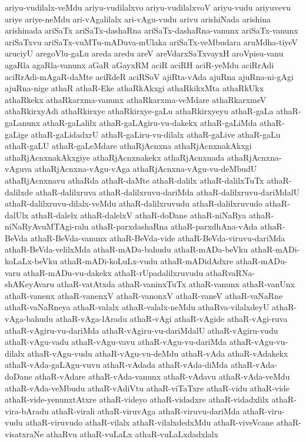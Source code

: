 {ariyu-vudilalx-veMdu
ariyu-vudilalxvo
ariyu-vudilalxvoV
ariyu-vudu
ariyuvevu
ariye
ariye-neMdu
ari-vAgalilalx
ari-vAgu-vudu
arivu
arishiNada
arishina
arishinada
ariSaTx
ariSaTx-dashaRna
ariSaTx-dashaRna-vanunx
ariSaTx-vanunx
ariSaTxvu
ariSaTx-vuMTu-mADuva-mUlaka
ariSaTx-veMbudara
aruMdha-tiyeV
aruciyU
aregoVlu-gaLu
areda
aredu
areV
areVdarxSaTxvayxH
aroVpisu-vanu
agaRla
agaRla-vanunx
aGaR
aGayxRM
aciR
aciRH
aciR-yeMdu
aciRrAdi
aciRrAdi-mAgaR-daMte
aciRdeR
aciRSoV
ajiRta-vAda
ajuRna
ajuRna-ni-gAgi
ajuRna-nige
athaR
athaR-Eke
athaRkAkxgi
athaRkikxMta
athaRkUkx
athaRkekx
athaRkarxma-vanunx
athaRkarxma-veMdare
athaRkarxmeV
athaRkirxyAdi
athaRkirxye
athaRkirxye-gaLu
athaRkirxyeyu
athaR-gaLa
athaR-gaLanunx
athaR-gaLalilx
athaR-gaLAgiru-vu-dakekx
athaR-gaLiMda
athaR-gaLige
athaR-gaLidadxrU
athaR-gaLiru-vu-dilalx
athaR-gaLive
athaR-gaLu
athaR-gaLU
athaR-gaLeMdare
athaRjAcnxna
athaRjAcnxnakAkxgi
athaRjAcnxnakAkxgiye
athaRjAcnxnakekx
athaRjAcnxnada
athaRjAcnxna-vAguva
athaRjAcnxna-vAgu-vAga
athaRjAcnxna-vAgu-vu-deMbudU
athaRjAcnxnavu
athaRda
athaR-daMte
athaR-dalilx
athaR-dalilxTuTx
athaR-dalilxde
athaR-dalilxruva
athaR-dalilxruvu-dariMda
athaR-dalilxruvu-dariMdalU
athaR-dalilxruvu-dilalx-veMdu
athaR-dalilxruvudu
athaR-dalilxruvudo
athaR-dalUlx
athaR-dalelx
athaR-dalelxV
athaR-doDane
athaR-niNaRya
athaR-niNaRyAvuMTAgi-ralu
athaR-parxdashaRna
athaR-parxdhAna-vAda
athaR-BeVda
athaR-BeVda-vanunx
athaR-BeVda-vide
athaR-BeVda-viruvu-dariMda
athaR-BeVda-velilxMda
athaR-mADa-bahudu
athaR-mADa-beVku
athaR-mADi-koLaLx-beVku
athaR-mADi-koLuLx-vudu
athaR-mADidAdxre
athaR-mADu-varu
athaR-mADu-vu-dakekx
athaR-rUpadalilxruvudu
athaRvaRNa-shAKeyAvaru
athaR-vatAtxda
athaR-vaninxTuTx
athaR-vanunx
athaR-vanUnx
athaR-vanenx
athaR-vanenxV
athaR-vanonxV
athaR-vaneV
athaR-vaNaRne
athaR-vaNaRneya
athaR-valalx
athaR-valalx-neMdu
athaRva-vilalxdeyU
athaR-vAga-bahudu
athaR-vAga-lAradu
athaR-vAgi
athaR-vAgide
athaR-vAgi-ruva
athaR-vAgiru-vu-dariMda
athaR-vAgiru-vu-dariMdalU
athaR-vAgiru-vudu
athaR-vAgu-vadu
athaR-vAgu-vavu
athaR-vAgu-vu-dariMda
athaR-vAgu-vu-dilalx
athaR-vAgu-vudu
athaR-vAgu-vu-deMdu
athaR-vAda
athaR-vAdakekx
athaR-vAda-gaLAgu-vuvu
athaR-vAdada
athaR-vAda-diMda
athaR-vAda-doDane
athaR-vAdare
athaR-vAda-vanunx
athaR-vAdavu
athaR-vAda-veMdu
athaR-vAda-veMbudu
athaR-vAdiVtu
athaR-viTaTxre
athaR-vidu
athaR-vide
athaR-vide-yenunxtAtxre
athaR-videyo
athaR-vidadxre
athaR-vidadxlilx
athaR-vira-bAradu
athaR-virali
athaR-viruvAga
athaR-viruvu-dariMda
athaR-viru-vudu
athaR-viruvudo
athaR-vilalx
athaR-vilalxdedxMdu
athaR-viveVcane
athaR-visatxraNe
athaRvu
athaR-vuLaLx
athaR-vuLaLxdadxlalx
}
